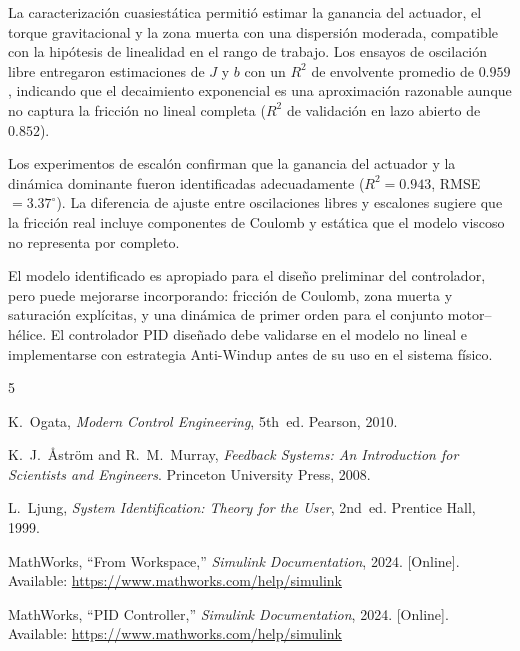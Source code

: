 \documentclass[journal, 10pt, twocolumn]{IEEEtran}
\begin{document}
La caracterización cuasiestática permitió estimar la ganancia del actuador,
el torque gravitacional y la zona muerta con una dispersión moderada,
compatible con la hipótesis de linealidad en el rango de trabajo. Los
ensayos de oscilación libre entregaron estimaciones de $J$ y $b$ con un
$R^2$ de envolvente promedio de $0.959$, indicando que el decaimiento
exponencial es una aproximación razonable aunque no captura la fricción no
lineal completa ($R^2$ de validación en lazo abierto de $0.852$).

Los experimentos de escalón confirman que la ganancia del actuador y la
dinámica dominante fueron identificadas adecuadamente ($R^2 = 0.943$,
RMSE $= 3.37^\circ$). La diferencia de ajuste entre oscilaciones libres y
escalones sugiere que la fricción real incluye componentes de Coulomb y
estática que el modelo viscoso no representa por completo.

El modelo identificado es apropiado para el diseño preliminar del
controlador, pero puede mejorarse incorporando: fricción de Coulomb, zona
muerta y saturación explícitas, y una dinámica de primer orden para el
conjunto motor--hélice. El controlador PID diseñado debe validarse en el
modelo no lineal e implementarse con estrategia Anti-Windup antes de su
uso en el sistema físico.


\begin{thebibliography}{5}

K.~Ogata,
\textit{Modern Control Engineering}, 5th~ed.
Pearson, 2010.

K.~J.~Åström and R.~M.~Murray,
\textit{Feedback Systems: An Introduction for Scientists and Engineers}.
Princeton University Press, 2008.

L.~Ljung,
\textit{System Identification: Theory for the User}, 2nd~ed.
Prentice Hall, 1999.

MathWorks, ``From Workspace,''
\textit{Simulink Documentation}, 2024.
[Online]. Available: \url{https://www.mathworks.com/help/simulink}

MathWorks, ``PID Controller,''
\textit{Simulink Documentation}, 2024.
[Online]. Available: \url{https://www.mathworks.com/help/simulink}

\end{thebibliography}
\end{document}
